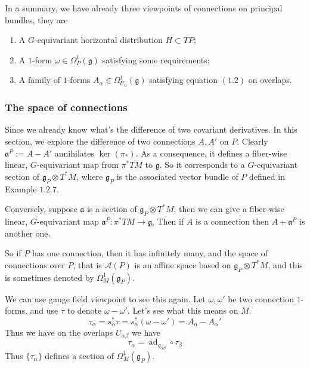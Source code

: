 \documentclass[11pt]{amsart}
\numberwithin{equation}{section}
\theoremstyle{plain}
\theoremstyle{plain}
\numberwithin{equation}{section}
\begin{document}
In a summary, we have already three viewpoints of connections on principal bundles, they are
\begin{enumerate}[$1.$]
\item A $G$-equivariant horizontal distribution $H\subset TP$;
\item A $1$-form $\omega\in\Omega_P^1(\mathfrak{g})$ satisfying some requirements;
\item A family of $1$-forms $A_{\alpha}\in\Omega_{U_{\alpha}}^1(\mathfrak{g})$ satisfying equation $(1.2)$ on overlaps.
\end{enumerate}


\subsubsection{The space of connections}
Since we already know what's the difference of two covariant derivatives. In this section, we explore the difference of two connections $A,A'$ on $P$. Clearly $\mathfrak{a}^P:=A-A'$ annihilates $\operatorname{ker}(\pi_*)$. As a consequence, it defines a fiber-wise linear, $G$-equivariant map from $\pi^*TM$ to $\mathfrak{g}$. So  it corresponds to a $G$-equivariant section of $\mathfrak{g}_P\otimes T^*M$, where $\mathfrak{g}_P$ is the associated vector bundle of $P$ defined in Example $1.2.7$.

Conversely, suppose $\mathfrak{a}$ is a section of $\mathfrak{g}_P\otimes T^*M$, then we can give a fiber-wise linear, $G$-equivariant map $\mathfrak{a}^P:\pi^*TM\to\mathfrak{g}$, Then if $A$ is a connection then $A+\mathfrak{a}^P$ is another one.

So if $P$ has one connection, then it has infinitely many, and the space of connections over $P$, that is $\mathscr{A}(P)$ is an affine space based on $\mathfrak{g}_P\otimes T^*M$, and this is sometimes denoted by $\Omega_M^1(\mathfrak{g}_P)$.

We can use gauge field viewpoint to see this again. Let $\omega,\omega'$ be two connection $1$-forms, and use $\tau$ to denote $\omega-\omega'$. Let's see what this means on $M$.
$$
\tau_{\alpha}=s_{\alpha}^*\tau=s_{\alpha}^*(\omega-\omega')=A_{\alpha}-A_{\alpha}'
$$
Thus we have on the overlaps $U_{\alpha\beta}$ we have 
$$
\tau_{\alpha}=\operatorname{ad}_{g_{\alpha\beta}}\circ\tau_{\beta}
$$
Thus $\{\tau_{\alpha}\}$ defines a section of $\Omega_M^1(\mathfrak{g}_P)$.
\end{document}
